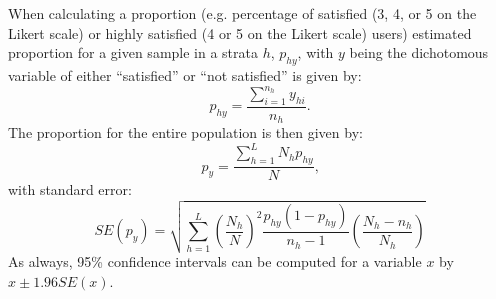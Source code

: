 \documentclass[12pt]{article} %
\begin{document}
When calculating a proportion (e.g. percentage of satisfied (3, 4, or 5 on the Likert scale) or highly
satisfied (4 or 5 on the Likert scale) users) estimated proportion for a given sample in a strata $h$, $p_{hy}$, with $y$ being the
dichotomous variable of either ``satisfied'' or ``not satisfied'' is given by:
\begin{equation}
p_{hy}=\frac{\sum\limits_{i=1}^{n_h} y_{hi}}{n_h}\mbox{.}
\end{equation}
The proportion for the entire population is then given by:
\begin{equation}
p_y=\frac{\sum\limits_{h=1}^L N_h p_{hy}}{N}\mbox{,}
\end{equation}
with standard error:
\begin{equation}
SE(p_y)=\sqrt{\sum\limits_{h=1}^L\left(\frac{N_h}{N}\right)^2\frac{p_{hy}\left(1-p_{hy}\right)}{n_h-1}\left(\frac{N_h-n_h}{N_h}\right)}
\end{equation}
As always, 95\% confidence intervals can be computed for a variable $x$ by $x \pm 1.96 SE(x)$.






\end{document}
